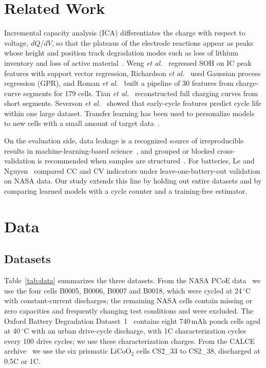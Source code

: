 \documentclass[conference]{IEEEtran}
\begin{document}
\section{Related Work}
Incremental capacity analysis (ICA) differentiates the charge with respect to voltage, $dQ/dV$, so that the plateaus of the electrode reactions appear as peaks whose height and position track degradation modes such as loss of lithium inventory and loss of active material~\cite{dubarry2011ica,dubarry2012modes,birkl2017diagnostics}. Weng \emph{et al.}~\cite{weng2013ica} regressed SOH on IC peak features with support vector regression, Richardson \emph{et al.}~\cite{richardson2017gpr} used Gaussian process regression (GPR), and Roman \emph{et al.}~\cite{roman2021pipeline} built a pipeline of 30 features from charge-curve segments for 179 cells. Tian \emph{et al.}~\cite{tian2021charging} reconstructed full charging curves from short segments. Severson \emph{et al.}~\cite{severson2019cycle} showed that early-cycle features predict cycle life within one large dataset. Transfer learning has been used to personalize models to new cells with a small amount of target data~\cite{ma2022transfer}.

On the evaluation side, data leakage is a recognized source of irreproducible results in machine-learning-based science~\cite{kaufman2012leakage,kapoor2023leakage}, and grouped or blocked cross-validation is recommended when samples are structured~\cite{roberts2017cv}. For batteries, Le and Nguyen~\cite{le2026charging} compared CC and CV indicators under leave-one-battery-out validation on NASA data. Our study extends this line by holding out entire datasets and by comparing learned models with a cycle counter and a training-free estimator.

\section{Data}
\subsection{Datasets}
Table~\ref{tab:data} summarizes the three datasets. From the NASA PCoE data~\cite{saha2007nasa} we use the four cells B0005, B0006, B0007 and B0018, which were cycled at 24\,$^\circ$C with constant-current discharges; the remaining NASA cells contain missing or zero capacities and frequently changing test conditions and were excluded. The Oxford Battery Degradation Dataset~1~\cite{birkl2017oxforddata,birkl2017thesis} contains eight 740\,mAh pouch cells aged at 40\,$^\circ$C with an urban drive-cycle discharge, with 1C characterization cycles every 100 drive cycles; we use these characterization charges. From the CALCE archive~\cite{calcearchive,he2011calce,xing2013calce} we use the six prismatic LiCoO$_2$ cells CS2\_33 to CS2\_38, discharged at 0.5C or 1C.
\end{document}
